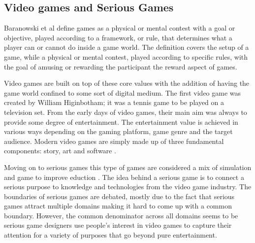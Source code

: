 \subsection{Video games and Serious Games}

Baranowski et al \cite{yuserious} define games as a physical or mental contest with a goal or objective, played according to a framework, or rule, that determines what a player can or cannot do inside a game world. The definition covers the setup of a game, while a physical or mental contest, played according to specific rules, with the goal of amusing or rewarding the participant the reward aspect of games.

Video games are built on top of these core values with the addition of having the game world confined to some sort of digital medium. The first video game was created by William Higinbotham; it was a tennis game to be played on a television set\cite{stanton2015brief}. From the early days of video games, their main aim was always to provide some degree of entertainment. The entertainment value is achieved in various ways depending on the gaming platform, game genre and the target audience. Modern video games are simply made up of three fundamental components: story, art and software \cite{zyda2005visual}.

Moving on to serious games this type of games are considered a mix of simulation and game to improve eduction \cite{abt1970}. The idea behind a serious game is to connect a serious purpose to knowledge and technologies from the video game industry\cite{michael2005serious}. The boundaries of serious games are debated, mostly due to the fact that serious games attract multiple domains making it hard to come up with a common boundary. However, the common denominator across all domains seems to be serious game designers use people's interest in video games to capture their attention for a variety of purposes that go beyond pure entertainment\cite{djaouti2011classifying}.

